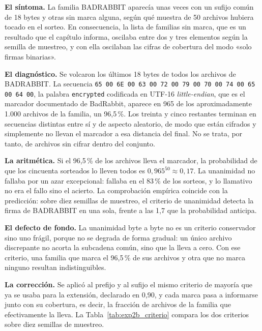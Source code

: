 \textbf{El síntoma.} La familia BADRABBIT aparecía unas veces con un sufijo común de 18 bytes y otras sin marca alguna, según qué muestra de 50 archivos hubiera tocado en el sorteo. En consecuencia, la lista de familias sin marca, que es un resultado que el capítulo informa, oscilaba entre dos y tres elementos según la semilla de muestreo, y con ella oscilaban las cifras de cobertura del modo «solo firmas binarias».

\textbf{El diagnóstico.} Se volcaron los últimos 18 bytes de todos los archivos de BADRABBIT. La secuencia \texttt{65 00 6E 00 63 00 72 00 79 00 70 00 74 00 65 00 64 00}, la palabra \texttt{encrypted} codificada en UTF-16 \textit{little-endian}, que es el marcador documentado de BadRabbit, aparece en 965 de los aproximadamente 1.000 archivos de la familia, un 96,5\,\%. Los treinta y cinco restantes terminan en secuencias distintas entre sí y de aspecto aleatorio, de modo que están cifrados y simplemente no llevan el marcador a esa distancia del final. No se trata, por tanto, de archivos sin cifrar dentro del conjunto.

\textbf{La aritmética.} Si el 96,5\,\% de los archivos lleva el marcador, la probabilidad de que los cincuenta sorteados lo lleven todos es $0{,}965^{50} \approx 0{,}17$. La unanimidad no fallaba por un azar excepcional: fallaba en el 83\,\% de los sorteos, y lo llamativo no era el fallo sino el acierto. La comprobación empírica coincide con la predicción: sobre diez semillas de muestreo, el criterio de unanimidad detecta la firma de BADRABBIT en una sola, frente a las 1,7 que la probabilidad anticipa.

\textbf{El defecto de fondo.} La unanimidad byte a byte no es un criterio conservador sino uno frágil, porque no se degrada de forma gradual: un único archivo discrepante no acorta la subcadena común, sino que la lleva a cero. Con ese criterio, una familia que marca el 96,5\,\% de sus archivos y otra que no marca ninguno resultan indistinguibles.

\textbf{La corrección.} Se aplicó al prefijo y al sufijo el mismo criterio de mayoría que ya se usaba para la extensión, declarado en 0,90, y cada marca pasa a informarse junto con su cobertura, es decir, la fracción de archivos de la familia que efectivamente la lleva. La Tabla~\ref{tab:exp2b_criterio} compara los dos criterios sobre diez semillas de muestreo.

